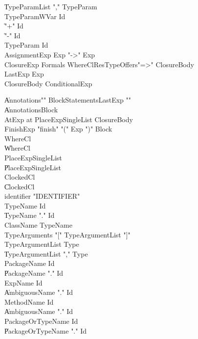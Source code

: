 {\begin{grammar}
    \| TypeParamList \xcd"," TypeParam\\
 TypeParamWVar  \: Id\\
    \| \xcd"+" Id\\
    \| \xcd"-" Id\\
 TypeParam  \: Id\\
 AssignmentExp  \: Exp  \xcd"->" Exp \\
 ClosureExp  \: Formals WhereCl\opt ResType\opt Offers\opt \xcd"=>" ClosureBody\\
 LastExp  \: Exp\\
 ClosureBody  \: ConditionalExp\\
\end{grammar}

\begin{grammar}

    \| Annotations\opt \xcd"{" BlockStatements\opt LastExp \xcd"}"\\
    \| Annotations\opt Block\\
 AtExp  \: at PlaceExpSingleList ClosureBody\\
 FinishExp  \: \xcd"finish" \xcd"(" Exp \xcd")" Block\\
 WhereCl\opt  \: \\
    \| WhereCl\\
 PlaceExpSingleList\opt  \: \\
    \| PlaceExpSingleList\\
 ClockedCl\opt  \: \\
    \| ClockedCl\\
 identifier  \: \xcd"IDENTIFIER" \\
 TypeName  \: Id\\
    \| TypeName \xcd"." Id\\
 ClassName  \: TypeName\\
 TypeArguments  \: \xcd"[" TypeArgumentList \xcd"]"\\
 TypeArgumentList  \: Type\\
    \| TypeArgumentList \xcd"," Type\\
 PackageName  \: Id\\
    \| PackageName \xcd"." Id\\
 ExpName  \: Id\\
    \| AmbiguousName \xcd"." Id\\
 MethodName  \: Id\\
    \| AmbiguousName \xcd"." Id\\
 PackageOrTypeName  \: Id\\
    \| PackageOrTypeName \xcd"." Id\\

\end{grammar}}
